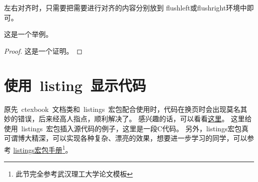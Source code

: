 左右对齐时，只需要把需要进行对齐的内容分别放到 flushleft或flushright环境中即可。
\begin{example}
这是一个举例。
\end{example}
\begin{proof}
这是一个证明。
\end{proof}

\section{使用~listing~显示代码}
原先~ctexbook~文档类和~listings~宏包配合使用时，代码在换页时会出现莫名其妙的错误，后来经高人指点，顺利解决了。
感兴趣的话，可以看看\href{http://bbs.ctex.org/viewthread.php?tid=53451}{这里}。
这里给使用~listings~宏包插入源代码的例子，这里是一段C代码。
另外，listings宏包真可谓博大精深，可以实现各种复杂、漂亮的效果，想要进一步学习的同学，可以参考
\href{http://mirror.ctan.org/macros/latex/contrib/listings/listings.pdf}{listings宏包手册\footnote{此节完全参考武汉理工大学论文模板}}。
